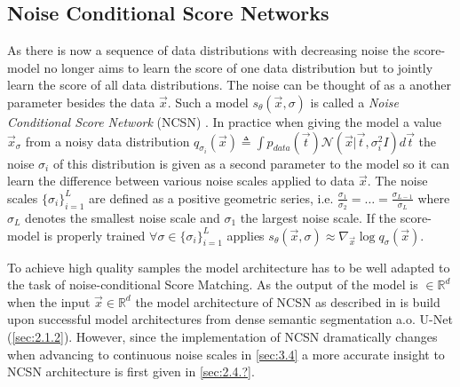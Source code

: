 \subsection{Noise Conditional Score Networks}
As there is now a sequence of data distributions with decreasing noise the score-model no longer aims to learn the score of one data distribution but to jointly learn the score of all data distributions. The noise can be thought of as a another parameter besides the data $\vec{x}$. Such a model $s_\theta(\vec{x}, \sigma)$ is called a \textit{Noise Conditional Score Network} (NCSN) \cite{score_1}. In practice when giving the model a value $\vec{x}_\sigma$ from a noisy data distribution $q_{\sigma_i}(\vec{x})\triangleq\int p_{data}(\vec{t})\mathcal{N}(\vec{x}|\vec{t},\sigma_i^2I)d\vec{t}$ the noise $\sigma_i$ of this distribution is given as a second parameter to the model so it can learn the difference between various noise scales applied to data $\vec{x}$. The noise scales $\{\sigma_i\}_{i=1}^L$ are defined as a positive geometric series, i.e. $\frac{\sigma_1}{\sigma_2}=\dots=\frac{\sigma_{L-1}}{\sigma_L}$ where $\sigma_L$ denotes the smallest noise scale and $\sigma_1$ the largest noise scale. If the score-model is properly trained $\forall\sigma\in\{\sigma_i\}_{i=1}^L$ applies $s_\theta(\vec{x}, \sigma)\approx\nabla_{\vec{x}}\log q_\sigma(\vec{x})$.

To achieve high quality samples the model architecture has to be well adapted to the task of noise-conditional Score Matching. As the output of the model is $\in\mathbb{R}^d$ when the input $\vec{x}\in\mathbb{R}^d$ the model architecture of NCSN as described in \cite{score_1} is build upon successful model architectures from dense semantic segmentation a.o. U-Net (\cref{sec:2.1.2}). However, since the implementation of NCSN dramatically changes when advancing to continuous noise scales in \cref{sec:3.4} a more accurate insight to NCSN architecture is first given in \cref{sec:2.4.?}.

